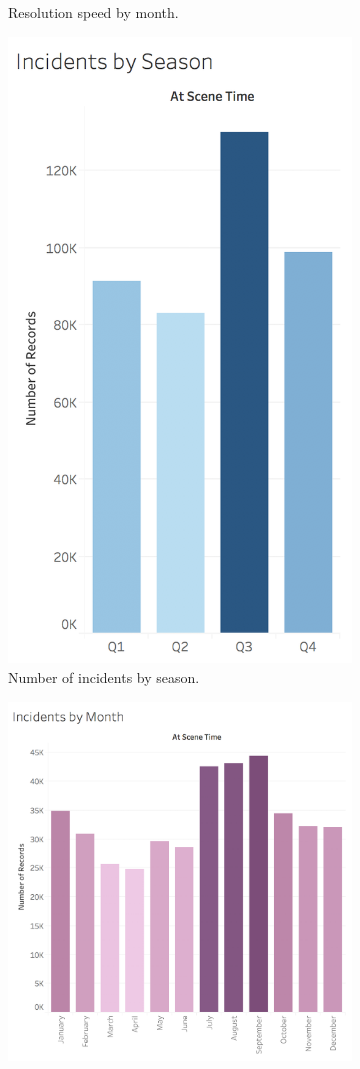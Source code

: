 \begin{figure}[h!]
\begin{subfigure}{0.55\textwidth}
        \caption{Resolution speed by month.}
        \label{fig:3_3_resolution_speed_by_month}
        \vspace*{5mm}        
    \end{subfigure}
    \begin{subfigure}{0.45\textwidth}
        \centering
        \includegraphics[width=0.562\linewidth]{figures/3_3_incidents_by_season} 
        \caption{Number of incidents by season.}
        \label{fig:3_3_resolution_speed_by_season}
        \vspace*{3mm}        
    \end{subfigure}
    \begin{subfigure}{0.55\textwidth}
        \centering
        \includegraphics[width=0.8\linewidth]{figures/3_3_incidents_by_month}

\end{subfigure}
\end{figure}
